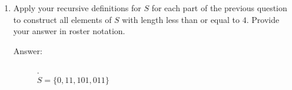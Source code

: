 \documentclass[12pt, oneside]{article}
\begin{document}
\begin{enumerate}
\item Apply your recursive definitions for $S$ for each part of the previous question to construct all elements of $S$ with length less than or equal to $4$. Provide your answer in roster notation.

\begin{description}
    \item[Answer:] .\\
    $S = \{0,11,101,011\}$
\end{description}

\end{enumerate}
\end{document}
